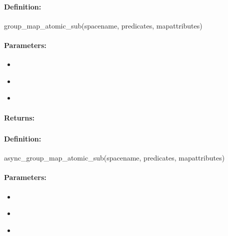 \paragraph{Definition:}
\begin{rubycode}
group_map_atomic_sub(spacename, predicates, mapattributes)
\end{rubycode}

\paragraph{Parameters:}
\begin{itemize}[noitemsep]
\item {}\\

\item {}\\

\item {}\\

\end{itemize}

\paragraph{Returns:}


\pagebreak
\subsubsection{}
\label{api:ruby:async_group_map_atomic_sub}


\paragraph{Definition:}
\begin{rubycode}
async_group_map_atomic_sub(spacename, predicates, mapattributes)
\end{rubycode}

\paragraph{Parameters:}
\begin{itemize}[noitemsep]
\item {}\\

\item {}\\

\item {}\\

\end{itemize}


